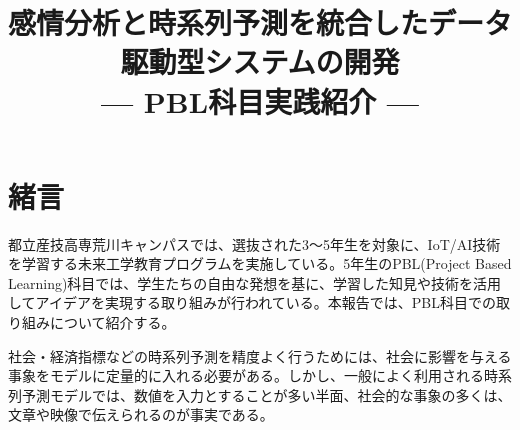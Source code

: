 \documentclass[a4paper, 10pt]{article}
\title{{\TitleJFont\bfseries\fontsize{14pt}{14pt} 感情分析と時系列予測を統合したデータ駆動型システムの開発 \\ \normalsize --- PBL科目実践紹介 ---}}
\author{}
\date{}
\begin{document}
\setlength{\columnsep}{7.5mm}


\section{緒言}

都立産技高専荒川キャンパスでは、選抜された3～5年生を対象に、IoT/AI技術を学習する未来工学教育プログラムを実施している。5年生のPBL(Project Based Learning)科目では、学生たちの自由な発想を基に、学習した知見や技術を活用してアイデアを実現する取り組みが行われている。本報告では、PBL科目での取り組みについて紹介する。


社会・経済指標などの時系列予測を精度よく行うためには、社会に影響を与える事象をモデルに定量的に入れる必要がある。しかし、一般によく利用される時系列予測モデルでは、数値を入力とすることが多い半面、社会的な事象の多くは、文章や映像で伝えられるのが事実である。
\end{document}
